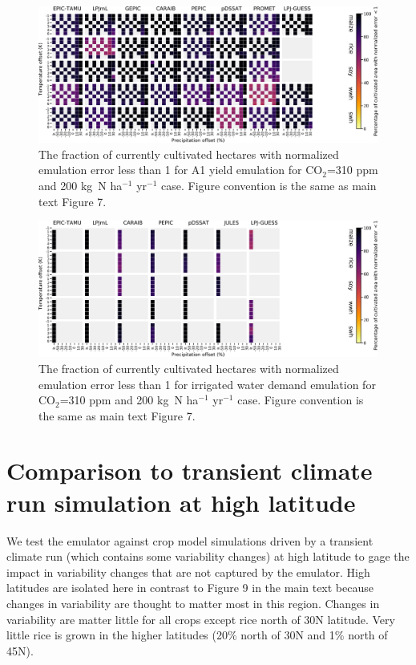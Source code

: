 \documentclass[12pt]{article}
\begin{document}
{{\begin{figure}[h!]
  \centering
  \includegraphics[width=15.5cm]{error_grid_360_cultivated_A1.png}
  \caption{
  The fraction of currently cultivated hectares with normalized emulation error less than 1 for A1 yield emulation for CO$_2$=310 ppm and 200 kg~N ha$^{-1}$ yr$^{-1}$ case. Figure convention is the same as main text Figure 7.
  }
  \label{fig:error810}
\end{figure}

\begin{figure}[h!]
  \centering
  \includegraphics[width=15.5cm]{error_grid_360_cultivated_IWD.png}
  \caption{
  The fraction of currently cultivated hectares with normalized emulation error less than 1 for irrigated water demand emulation for CO$_2$=310 ppm and 200 kg~N ha$^{-1}$ yr$^{-1}$ case. Figure convention is the same as main text Figure 7.
  }
  \label{fig:error810}
\end{figure}

\clearpage
\section{Comparison to transient climate run simulation at high latitude}
\begin{flushleft}
We test the emulator against crop model simulations driven by a transient climate run (which contains some variability changes) at high latitude to gage the impact in variability changes that are not captured by the emulator. 
High latitudes are isolated here in contrast to Figure 9 in the main text because changes in variability are thought to matter most in this region.
Changes in variability are matter little for all crops except rice north of 30N latitude. Very little rice is grown in the higher latitudes (20\% north of 30N and 1\% north of 45N).
\end{flushleft}

}}
\end{document}
